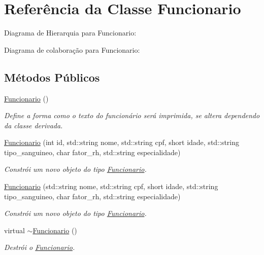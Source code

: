 \hypertarget{classFuncionario}{}\section{Referência da Classe Funcionario}
\label{classFuncionario}


Diagrama de Hierarquia para Funcionario\+:


Diagrama de colaboração para Funcionario\+:
\subsection*{Métodos Públicos}
\begin{DoxyCompactItemize}
\item 
\hyperlink{classFuncionario_a7cd39b2c6cd2449162481a8c0e7a2429}{Funcionario} ()
\begin{DoxyCompactList}\small\item\em Define a forma como o texto do funcionário será imprimida, se altera dependendo da classe derivada. \end{DoxyCompactList}\item 
\hyperlink{classFuncionario_acc3a59366c68a3a56a4d4114931a11c9}{Funcionario} (int id, std\+::string nome, std\+::string cpf, short idade, std\+::string tipo\+\_\+sanguineo, char fator\+\_\+rh, std\+::string especialidade)
\begin{DoxyCompactList}\small\item\em Constrói um novo objeto do tipo \hyperlink{classFuncionario}{Funcionario}. \end{DoxyCompactList}\item 
\hyperlink{classFuncionario_a0405143b26bf96766afca475fabf8c63}{Funcionario} (std\+::string nome, std\+::string cpf, short idade, std\+::string tipo\+\_\+sanguineo, char fator\+\_\+rh, std\+::string especialidade)
\begin{DoxyCompactList}\small\item\em Constrói um novo objeto do tipo \hyperlink{classFuncionario}{Funcionario}. \end{DoxyCompactList}\item 
\mbox{\label{classFuncionario_a31cffbde6168ea93e5eee484b4221f52}} 
virtual \hyperlink{classFuncionario_a31cffbde6168ea93e5eee484b4221f52}{$\sim$\+Funcionario} ()
\begin{DoxyCompactList}\small\item\em Destrói o \hyperlink{classFuncionario}{Funcionario}. \end{DoxyCompactList}\item 

\end{DoxyCompactItemize}
